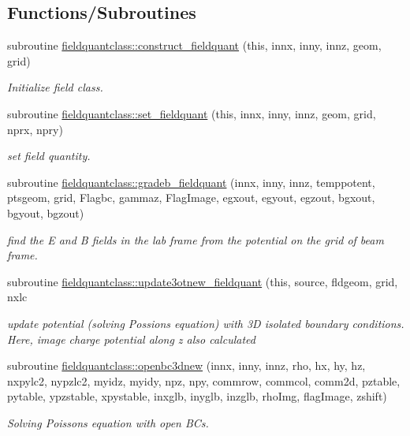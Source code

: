 \subsection*{Functions/\+Subroutines}
\begin{DoxyCompactItemize}
\item 
subroutine \mbox{\hyperlink{namespacefieldquantclass_a02f323941fc76278b26a3aa06fa3bbdd}{fieldquantclass\+::construct\+\_\+fieldquant}} (this, innx, inny, innz, geom, grid)
\begin{DoxyCompactList}\small\item\em Initialize field class. \end{DoxyCompactList}\item 
subroutine \mbox{\hyperlink{namespacefieldquantclass_a2d6cd3fb8b4d962adbd4206a5fbd13ce}{fieldquantclass\+::set\+\_\+fieldquant}} (this, innx, inny, innz, geom, grid, nprx, npry)
\begin{DoxyCompactList}\small\item\em set field quantity. \end{DoxyCompactList}\item 
subroutine \mbox{\hyperlink{namespacefieldquantclass_a1424ab249c01287bbfe998370d2c5703}{fieldquantclass\+::gradeb\+\_\+fieldquant}} (innx, inny, innz, temppotent, ptsgeom, grid, Flagbc, gammaz, Flag\+Image, egxout, egyout, egzout, bgxout, bgyout, bgzout)
\begin{DoxyCompactList}\small\item\em find the E and B fields in the lab frame from the potential on the grid of beam frame. \end{DoxyCompactList}\item 
subroutine \mbox{\hyperlink{namespacefieldquantclass_a06d0461c3c52859b9fa8b0c4d5f0db46}{fieldquantclass\+::update3otnew\+\_\+fieldquant}} (this, source, fldgeom, grid, nxlc
\begin{DoxyCompactList}\small\item\em update potential (solving Possion\textquotesingle{}s equation) with 3D isolated boundary conditions. Here, image charge potential along z also calculated \end{DoxyCompactList}\item 
subroutine \mbox{\hyperlink{namespacefieldquantclass_aae4177005bffdb768a50a98b860c111a}{fieldquantclass\+::openbc3dnew}} (innx, inny, innz, rho, hx, hy, hz, nxpylc2, nypzlc2, myidz, myidy, npz, npy, commrow, commcol, comm2d, pztable, pytable, ypzstable, xpystable, inxglb, inyglb, inzglb, rho\+Img, flag\+Image, zshift)
\begin{DoxyCompactList}\small\item\em Solving Poisson\textquotesingle{}s equation with open B\+Cs. \end{DoxyCompactList}\item 

\end{DoxyCompactItemize}
